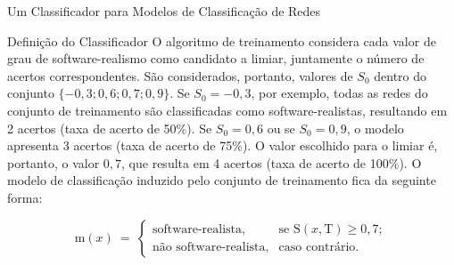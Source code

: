 \begin{section}{Um Classificador para Modelos de Classificação de Redes}
\begin{subsection}{Definição do Classificador}
O algoritmo de treinamento considera cada valor de grau de software-realismo como candidato a limiar, juntamente o número de acertos correspondentes. São considerados, portanto, valores de $S_0$ dentro do conjunto $\{-0,3; 0,6; 0,7; 0,9\}$. Se $S_0 = -0,3$, por exemplo, todas as redes do conjunto de treinamento são classificadas como software-realistas, resultando em 2 acertos (taxa de acerto de 50\%). Se $S_0 = 0,6$ ou se $S_0 = 0,9$, o modelo apresenta 3 acertos (taxa de acerto de 75\%). O valor escolhido para o limiar é, portanto, o valor $0,7$, que resulta em 4 acertos (taxa de acerto de 100\%). O modelo de classificação induzido pelo conjunto de treinamento fica da seguinte forma:

$$
\mathrm{m}(x) ~=~
\left\{
\begin{array}{cl}
\mbox{software-realista,} & \mbox{se } \mathrm{S}(x, \mbox{T}) \ge 0,7; \\
\mbox{não software-realista,} & \mbox{caso contrário.}
\end{array}
\right.
$$



\end{subsection}
\end{section}

